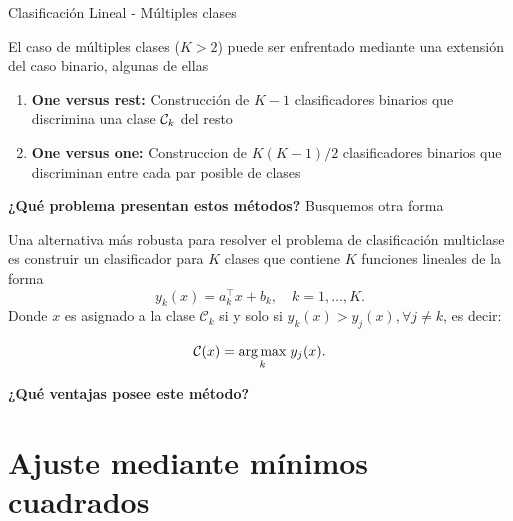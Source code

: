 \documentclass[9pt, handout]{beamer}
\begin{document}
\begin{frame}{Clasificación Lineal - Múltiples clases}

El caso de múltiples clases ($K>2$) puede ser enfrentado mediante una extensión del caso binario, algunas de ellas 

\begin{enumerate}

  \item \textbf{One versus rest: } Construcción de $K-1$ clasificadores binarios que discrimina una clase ${\mathcal C}_k$ del resto \pause


  \item \textbf{One versus one: } Construccion de $K(K-1)/2$ clasificadores binarios que discriminan entre cada par posible de clases \pause

\end{enumerate}

\textbf{¿Qué problema presentan estos métodos?} \pause Busquemos otra forma \pause 

\vspace{0.5cm}

Una alternativa más robusta para resolver el problema de clasificación multiclase es construir un clasificador para $K$ clases que contiene $K$ funciones lineales de la forma 
\begin{equation*}
  y_k(x) = a_k^\top x + b_k, \quad k=1,\ldots,K.
\end{equation*}
\pause 
Donde $x$ es asignado a la clase $\mathcal{C}_k$ si y solo si $y_k(x) > y_j(x), \forall j\neq k$, es decir: 

\begin{equation*}
  \mathcal{C}(x) = \underset{k}{\operatorname*{arg\,max}}\hspace{1mm} y_j(x).
\end{equation*}

\pause 
\textbf{¿Qué ventajas posee este método?}

\end{frame}

\section{Ajuste mediante mínimos cuadrados}
\end{document}
